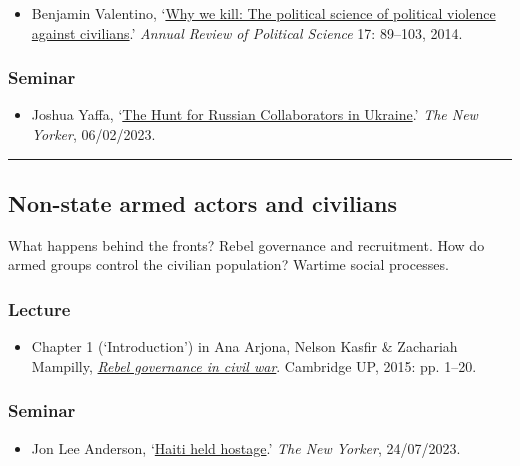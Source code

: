 \documentclass[12pt, a4paper]{article}
\begin{document}
\begin{itemize}
\setlength\itemsep{0pt}
\item Benjamin Valentino, `\href{https://doi.org/10.1146/annurev-polisci-082112-141937}{Why we kill: The political science of political violence against civilians}.' \textit{Annual Review of Political Science} 17: 89--103, 2014.
\end{itemize}

\subsubsection*{Seminar}

\begin{itemize}
\setlength\itemsep{0pt}
\item Joshua Yaffa, `\href{https://www.newyorker.com/magazine/2023/02/06/the-hunt-for-russian-collaborators-in-ukraine}{The Hunt for Russian Collaborators in Ukraine}.' \textit{The New Yorker}, 06/02/2023.
\end{itemize}

\hrule %

\subsection{Non-state armed actors and civilians}\label{rebels}

What happens behind the fronts? Rebel governance and recruitment. How do armed groups control the civilian population? Wartime social processes.

\subsubsection*{Lecture}

\begin{itemize}
\setlength\itemsep{0pt}
\item Chapter 1 (`Introduction') in Ana Arjona, Nelson Kasfir \& Zachariah Mampilly, \href{https://doi.org/10.1017/CBO9781316182468}{\textit{Rebel governance in civil war}}. Cambridge UP, 2015: pp. 1--20.
\end{itemize}

\subsubsection*{Seminar}

\begin{itemize}
\setlength\itemsep{-5pt}
\item Jon Lee Anderson, `\href{https://www.newyorker.com/magazine/2023/07/24/haiti-held-hostage}{Haiti held hostage}.' \textit{The New Yorker}, 24/07/2023.
\end{itemize}
\end{document}
